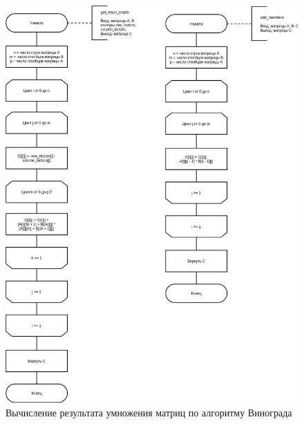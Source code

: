 \begin{figure}[H]
	\begin{center}
		\includegraphics[scale=0.5]{img/winograd_result.png}
	\end{center}
	\captionsetup{justification=centering}
	\caption{Вычисление результата умножения матриц по алгоритму Винограда}
	\label{img:winograd_result}
\end{figure}


